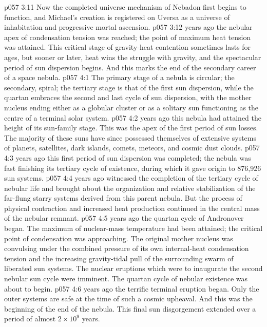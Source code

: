 \vs p057 3:11 Now the completed universe mechanism of Nebadon first begins to function, and Michael’s creation is registered on Uversa as a universe of inhabitation and progressive mortal ascension.
\vs p057 3:12 \pc {} years ago the nebular apex of condensation tension was reached; the point of maximum heat tension was attained. This critical stage of gravity\hyp{}heat contention sometimes lasts for ages, but sooner or later, heat wins the struggle with gravity, and the spectacular period of sun dispersion begins. And this marks the end of the secondary career of a space nebula.
\vs p057 4:1 The primary stage of a nebula is circular; the secondary, spiral; the tertiary stage is that of the first sun dispersion, while the quartan embraces the second and last cycle of sun dispersion, with the mother nucleus ending either as a globular cluster or as a solitary sun functioning as the centre of a terminal solar system.
\vs p057 4:2 \pc {} years ago this nebula had attained the height of its sun\hyp{}family stage. This was the apex of the first period of sun losses. The majority of these suns have since possessed themselves of extensive systems of planets, satellites, dark islands, comets, meteors, and cosmic dust clouds.
\vs p057 4:3 \pc {} years ago this first period of sun dispersion was completed; the nebula was fast finishing its tertiary cycle of existence, during which it gave origin to 876,926 sun systems.
\vs p057 4:4 \pc {} years ago witnessed the completion of the tertiary cycle of nebular life and brought about the organization and relative stabilization of the far\hyp{}flung starry systems derived from this parent nebula. But the process of physical contraction and increased heat production continued in the central mass of the nebular remnant.
\vs p057 4:5 \pc {} years ago the quartan cycle of Andronover began. The maximum of nuclear\hyp{}mass temperature had been attained; the critical point of condensation was approaching. The original mother nucleus was convulsing under the combined pressure of its own internal\hyp{}heat condensation tension and the increasing gravity\hyp{}tidal pull of the surrounding swarm of liberated sun systems. The nuclear eruptions which were to inaugurate the second nebular sun cycle were imminent. The quartan cycle of nebular existence was about to begin.
\vs p057 4:6 \pc {} years ago the terrific terminal eruption began. Only the outer systems are safe at the time of such a cosmic upheaval. And this was the beginning of the end of the nebula. This final sun disgorgement extended over a period of almost $2 \times 10^9$ years.
